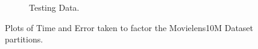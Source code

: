 \begin{figure}
\begin{subfigure}[b]{.45\textwidth}
\begin{center}
		\caption{Testing Data. }
\end{center}
	\end{subfigure}
\hfill
	\caption{Plots of Time and Error taken to factor the Movielens10M Dataset partitions.}	
\end{figure}
